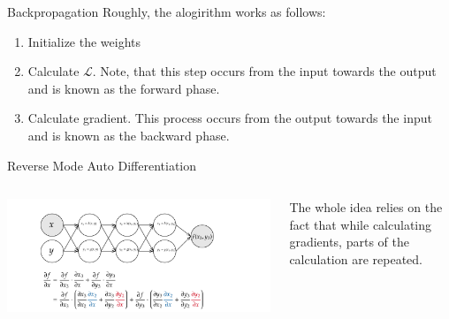 \begin{frame}
\begin{center}

\end{center}
\end{frame}
\begin{frame}{Backpropagation}
	Roughly, the alogirithm works as follows:
	\begin{enumerate}[$\bullet$]
	\item Initialize the weights\pause
	\item Calculate $\mathcal{L}$. Note, that this step occurs from the input towards the output and is known as the forward phase.
	\item Calculate gradient. This process occurs from the output towards the input and is known as the backward phase. 
	\end{enumerate}
  \end{frame}
  

  \begin{frame}{Reverse Mode Auto Differentiation}
	\begin{columns}[T]
	\begin{column}{0.8\textwidth}
	\begin{center}
		\includegraphics[width=\textwidth]{images/revmodeautodiff.png}
	\end{center}
	\end{column}
	\begin{column}{0.2\textwidth}
	The whole idea relies on the fact that while calculating gradients, parts of the calculation are repeated.	
	\end{column}
	\end{columns}
\end{frame}

